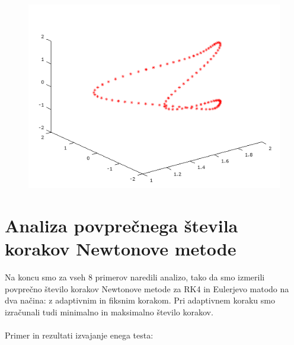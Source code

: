 \documentclass[12pt]{article}
\begin{document}
\begin{minipage}{\textwidth}
\begin{figure}[H]
			\includegraphics[scale=0.5]{primer8_4} 
		\end{figure} 
	\end{minipage}
	\newpage
	\section{Analiza povprečnega števila korakov Newtonove metode} 
	Na koncu smo za vseh 8 primerov naredili analizo, tako da smo izmerili povprečno število korakov Newtonove metode za RK4 in Eulerjevo matodo na dva načina: z adaptivnim in fiksnim korakom. Pri adaptivnem koraku smo izračunali tudi minimalno in maksimalno število korakov.\\ \\
	Primer in rezultati izvajanje enega testa: 
	
\end{document}
